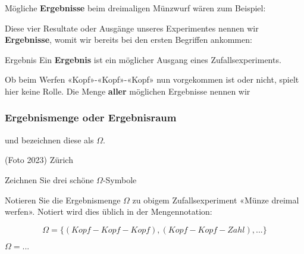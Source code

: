 Mögliche \textbf{Ergebnisse} beim dreimaligen Münzwurf wären zum
Beispiel:


Diese vier Resultate oder Ausgänge unseres Experimentes nennen wir \textbf{Ergebnisse}, womit wir bereits
bei den ersten Begriffen ankommen:

\begin{definition}{Ergebnis}{}
Ein \textbf{Ergebnis} ist ein möglicher Ausgang eines
Zufallsexperiments.
\end{definition}

Ob beim Werfen «Kopf»-«Kopf»-«Kopf» nun
vorgekommen ist oder nicht, spielt hier keine Rolle. Die Menge \textbf{aller}
möglichen Ergebnisse nennen wir

\subsubsection{Ergebnismenge oder Ergebnisraum}

und bezeichnen diese als $\Omega$.

\begin{center}{\small{(Foto 2023) Zürich}}\end{center}
Zeichnen Sie drei schöne {\huge $\Omega$}-Symbole

\newpage

Notieren Sie die Ergebnismenge $\Omega$ zu obigem
Zufallsexperiment «Münze dreimal werfen». Notiert wird dies üblich in der Mengennotation:

$$\Omega = \{ (Kopf-Kopf-Kopf), (Kopf-Kopf-Zahl), ...\}$$

$\Omega = ...$



